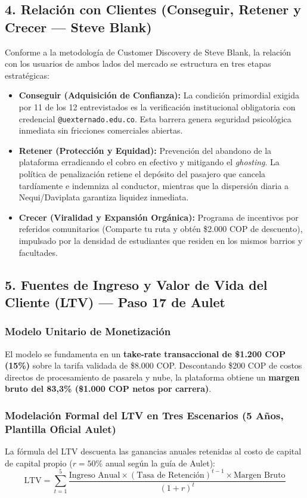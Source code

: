 \documentclass[11pt,a4paper]{article}
\begin{document}
\subsection{4. Relaci\'on con Clientes (Conseguir, Retener y Crecer --- Steve Blank)}
Conforme a la metodolog\'ia de Customer Discovery de Steve Blank, la relaci\'on con los usuarios de ambos lados del mercado se estructura en tres etapas estrat\'egicas:
\begin{itemize}[leftmargin=*]
    \item \textbf{Conseguir (Adquisici\'on de Confianza):} La condici\'on primordial exigida por 11 de los 12 entrevistados es la verificaci\'on institucional obligatoria con credencial \texttt{@uexternado.edu.co}. Esta barrera genera seguridad psicol\'ogica inmediata sin fricciones comerciales abiertas.
    \item \textbf{Retener (Protecci\'on y Equidad):} Prevenci\'on del abandono de la plataforma erradicando el cobro en efectivo y mitigando el \textit{ghosting}. La pol\'itica de penalizaci\'on retiene el dep\'osito del pasajero que cancela tard\'iamente e indemniza al conductor, mientras que la dispersi\'on diaria a Nequi/Daviplata garantiza liquidez inmediata.
    \item \textbf{Crecer (Viralidad y Expansi\'on Org\'anica):} Programa de incentivos por referidos comunitarios (\guillemotleft Comparte tu ruta y obt\'en \$2.000 COP de descuento\guillemotright), impulsado por la densidad de estudiantes que residen en los mismos barrios y facultades.
\end{itemize}

\subsection{5. Fuentes de Ingreso y Valor de Vida del Cliente (LTV) --- Paso 17 de Aulet}

\subsubsection{Modelo Unitario de Monetizaci\'on}
El modelo se fundamenta en un \textbf{take-rate transaccional de \$1.200 COP (15\%)} sobre la tarifa validada de \$8.000 COP. Descontando \$200 COP de costos directos de procesamiento de pasarela y nube, la plataforma obtiene un \textbf{margen bruto del 83,3\% (\$1.000 COP netos por carrera)}.

\subsubsection{Modelaci\'on Formal del LTV en Tres Escenarios (5 A\~nos, Plantilla Oficial Aulet)}
La f\'ormula del LTV descuenta las ganancias anuales retenidas al costo de capital de capital propio ($r = 50\%$ anual seg\'un la gu\'ia de Aulet):
$$\text{LTV} = \sum_{t=1}^{5} \frac{\text{Ingreso Anual} \times (\text{Tasa de Retenci\'on})^{t-1} \times \text{Margen Bruto}}{(1 + r)^t}$$
\end{document}
